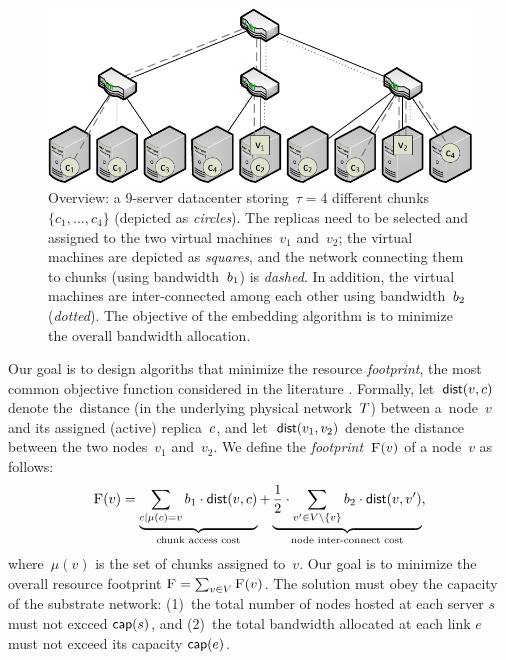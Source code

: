\begin{figure}[t]
\centering
\includegraphics[width=0.79\columnwidth]{figs/static-mapping/data_locality_no_legend.pdf}
\caption{Overview: a 9-server datacenter storing~$\tau=4$ different chunks~$\{c_1,\ldots,c_4\}$ (depicted as \emph{circles}). The replicas need to be selected and assigned to the two
 virtual machines~$v_1$ and~$v_2$; the virtual machines are depicted as \emph{squares}, and
 the network connecting them to chunks (using bandwidth~$b_1$) is \emph{dashed}. In addition, the virtual machines are inter-connected among
 each other using bandwidth~$b_2$ (\emph{dotted}). The objective of the embedding algorithm is to minimize the overall bandwidth allocation.}\label{fig:overview}
\end{figure}


Our goal is to design algoriths that minimize the resource \emph{footprint}, the most common objective function considered in the literature \cite{fischer-survey}.
Formally, let~$\mathrm{\textsf{dist}}(v,c)$ denote the~distance (in the underlying physical network~$T$) between a~node~$v$ and
its assigned (active) replica~$c$, and let~$\mathrm{\textsf{dist}}(v_1,v_2)$ denote the distance between the two nodes~$v_1$ and~$v_2$.
We define the \emph{footprint}~$\textsc{F}(v)$ of a node~$v$ as follows:
$$
\textsc{F}(v) = \underbrace{\sum_{c \mid \mu(c) = v} b_1 \cdot \mathrm{\textsf{dist}}(v,c)}_{\text{chunk access cost}} +  \underbrace{\frac{1}{2} \cdot \sum_{v' \in V\setminus\{v\}} b_2 \cdot \mathrm{\textsf{dist}}(v,v')}_{\text{node inter-connect cost}},
$$
where~$\mu(v)$ is the set of chunks assigned to~$v$.
Our goal is to minimize the overall resource footprint $\textsc{F}=\sum_{v\in V} \textsc{F}(v)$.
The solution must obey the capacity of the substrate network: (1)~the total number of nodes hosted at each server $s$ must not excced $\textsf{cap}(s)$, and (2)~the total bandwidth allocated at each link $e$ must not exceed its capacity $\textsf{cap}(e)$.

